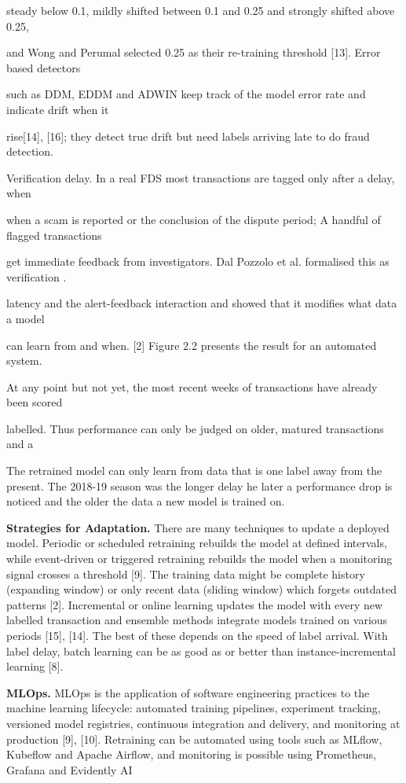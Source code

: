 \documentclass[11pt,letterpaper]{report}
\begin{document}
steady below 0.1, mildly shifted between 0.1 and 0.25 and strongly shifted above 0.25,

and Wong and Perumal selected 0.25 as their re-training threshold [13]. Error based detectors

such as DDM, EDDM and ADWIN keep track of the model error rate and indicate drift when it

rise[14], [16]; they detect true drift but need labels arriving late to do fraud detection.

Verification delay. In a real FDS most transactions are tagged only after a delay, when

when a scam is reported or the conclusion of the dispute period; A handful of flagged transactions

get immediate feedback from investigators. Dal Pozzolo et al. formalised this as verification .

latency and the alert-feedback interaction and showed that it modifies what data a model

can learn from and when. [2] Figure 2.2 presents the result for an automated system.

At any point but not yet, the most recent weeks of transactions have already been scored

labelled. Thus performance can only be judged on older, matured transactions and a

The retrained model can only learn from data that is one label away from the present. The 2018-19 season was the longer delay he later a performance drop is noticed and the older the data a new model is trained on.

\textbf{Strategies for Adaptation.} There are many techniques to update a deployed model. Periodic or scheduled retraining rebuilds the model at defined intervals, while event-driven or triggered retraining rebuilds the model when a monitoring signal crosses a threshold [9]. The training data might be complete history (expanding window) or only recent data (sliding window) which forgets outdated patterns [2]. Incremental or online learning updates the model with every new labelled transaction and ensemble methods integrate models trained on various periods [15], [14]. The best of these depends on the speed of label arrival. With label delay, batch learning can be as good as or better than instance-incremental learning [8].

\textbf{MLOps.} MLOps is the application of software engineering practices to the machine learning lifecycle: automated training pipelines, experiment tracking, versioned model registries, continuous integration and delivery, and monitoring at production [9], [10]. Retraining can be automated using tools such as MLflow, Kubeflow and Apache Airflow, and monitoring is possible using Prometheus, Grafana and Evidently AI
\end{document}
